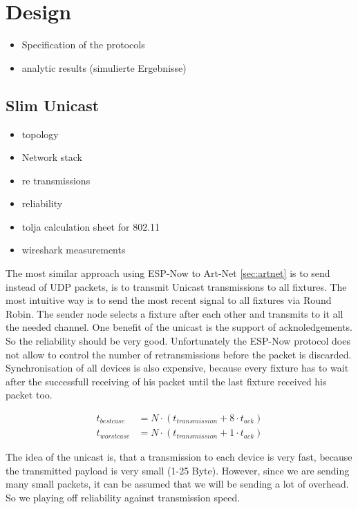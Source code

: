 \documentclass[]{ccs-thesis}
\begin{document}
\section{Design}
\label{sec:cross-reff}
\begin{itemize}
	\item Specification of the protocols
	\item analytic results (simulierte Ergebnisse)
\end{itemize}

\subsection*{Slim Unicast}
\begin{itemize}
\item topology
\item Network stack
\item re transmissions
\item reliability
\item tolja calculation sheet for 802.11
\item wireshark measurements
\end{itemize}

The most similar approach using ESP-Now to Art-Net \cref{sec:artnet} is to send instead of \ac{UDP} packets, is to transmit Unicast transmissions to all fixtures.
The most intuitive way is to send the most recent signal to all fixtures via Round Robin.
The sender node selects a fixture after each other and transmits to it all the needed channel.
One benefit of the unicast is the support of acknoledgements. So the reliability should be very good. 
Unfortunately the ESP-Now protocol does not allow to control the number of retransmissions before the packet is discarded.
Synchronisation of all devices is also expensive, because every fixture has to wait after the successfull receiving of his packet until the last fixture received his packet too.

\begin{align*} \label{eq:transmission_unicast}
	t_{bestcase}  &= N \cdot (t_{transmission} + 8 \cdot t_{ack}) \\
	t_{worstcase} &= N \cdot (t_{transmission} + 1 \cdot t_{ack})
\end{align*} 

The idea of the unicast is, that a transmission to each device is very fast, because the transmitted payload is very small (1-25 Byte).
However, since we are sending many small packets, it can be assumed that we will be sending a lot of overhead.
So we playing off reliability against transmission speed.
\end{document}
